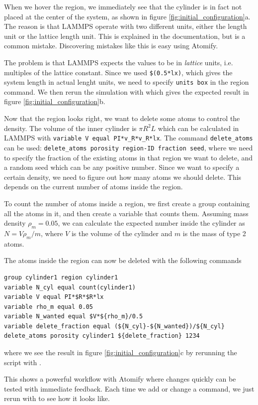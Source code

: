 \documentclass[12pt,a4paper,final]{iopart}
\newcommand{\code}[1]{\colorbox{light-gray}{\color{RawSienna}\texttt{#1}}}
\begin{document}
When we hover the region, we immediately see that the cylinder is in fact not placed at the center of the system, as shown in figure \ref{fig:initial_configuration}a.
The reason is that LAMMPS operate with two different units, either the length unit or the lattice length unit. This is explained in the documentation, but is a common mistake.
Discovering mistakes like this is easy using Atomify.

The problem is that LAMMPS expects the values to be in \textit{lattice} units, i.e. multiples of the lattice constant.
Since we used \code{\$(0.5*lx)}, which gives the system length in actual lenght units, we need to specify \code{units box} in the region command.
We then rerun the simulation with  which gives the expected result in figure \ref{fig:initial_configuration}b.

Now that the region looks right, we want to delete some atoms to control the density.
The volume of the inner cylinder is $\pi R^2 L$ which can be calculated in LAMMPS with \code{variable V equal PI*v\_R*v\_R*lx}.
The command \code{delete\_atoms} can be used: \code{delete\_atoms porosity region-ID fraction seed},
where we need to specify the fraction of the existing atoms in that region we want to delete, and a random seed which can be any positive number.
Since we want to specify a certain density, we need to figure out how many atoms we
should delete. This depends on the current number of atoms inside the region.

To count the number of atoms inside a region, we first create a group containing all the atoms in it, and then create a variable that counts them.
Assuming mass density $\rho_m = 0.05$, we can calculate the expected number inside the cylinder as $N = V\rho_m/m$,
where $V$ is the volume of the cylinder and $m$ is the mass of type 2 atoms.

The atoms inside the region can now be deleted with the following commands
\begin{lstlisting}
group cylinder1 region cylinder1
variable N_cyl equal count(cylinder1)
variable V equal PI*$R*$R*lx
variable rho_m equal 0.05
variable N_wanted equal $V*${rho_m}/0.5
variable delete_fraction equal (${N_cyl}-${N_wanted})/${N_cyl}
delete_atoms porosity cylinder1 ${delete_fraction} 1234
\end{lstlisting}
where we see the result in figure \ref{fig:initial_configuration}c by rerunning the script with .

This shows a powerful workflow with Atomify where changes quickly can be tested with immediate feedback.
Each time we add or change a command, we just rerun with  to see how it looks like.
\end{document}
